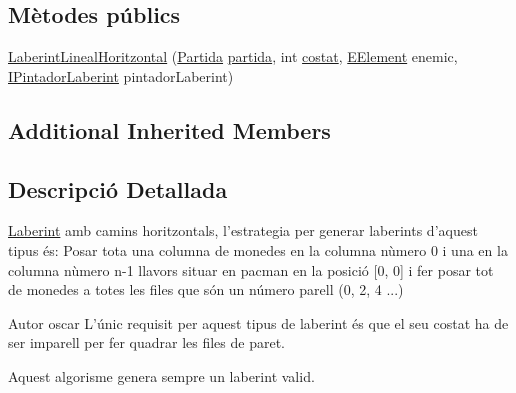 \subsection*{Mètodes públics}
\begin{DoxyCompactItemize}
\item 
\hyperlink{classlogica_1_1laberints_1_1_laberint_lineal_horitzontal_a3aa38bdd438bdc9db196ae507944e34a}{Laberint\+Lineal\+Horitzontal} (\hyperlink{classlogica_1_1_partida}{Partida} \hyperlink{classlogica_1_1laberints_1_1_laberint_a7183ce070714f73e078bb36e8c21b575}{partida}, int \hyperlink{classlogica_1_1laberints_1_1_laberint_ae874ac4889592b811709f5b967d85286}{costat}, \hyperlink{enumlogica_1_1enumeracions_1_1_e_element}{E\+Element} enemic, \hyperlink{interfaceinterficie_1_1_i_pintador_laberint}{I\+Pintador\+Laberint} pintador\+Laberint)
\end{DoxyCompactItemize}
\subsection*{Additional Inherited Members}


\subsection{Descripció Detallada}
\hyperlink{classlogica_1_1laberints_1_1_laberint}{Laberint} amb camins horitzontals, l'estrategia per generar laberints d'aquest tipus és\+: Posar tota una columna de monedes en la columna nùmero 0 i una en la columna nùmero n-\/1 llavors situar en pacman en la posició \mbox{[}0, 0\mbox{]} i fer posar tot de monedes a totes les files que són un número parell (0, 2, 4 ...) 

\begin{DoxyAuthor}{Autor}
oscar L'únic requisit per aquest tipus de laberint és que el seu costat ha de ser imparell per fer quadrar les files de paret.
\end{DoxyAuthor}
Aquest algorisme genera sempre un laberint valid. 

